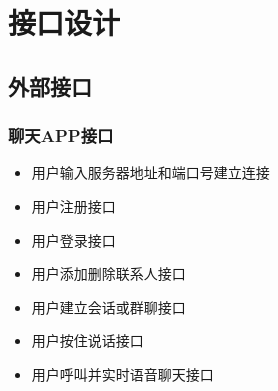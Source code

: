 \chapter{接口设计}
\section{外部接口}

\subsection{聊天APP接口}
\begin{itemize}
  \item 用户输入服务器地址和端口号建立连接
  \item 用户注册接口
  \item 用户登录接口
  \item 用户添加删除联系人接口
  \item 用户建立会话或群聊接口
  \item 用户按住说话接口
  \item 用户呼叫并实时语音聊天接口
\end{itemize}


